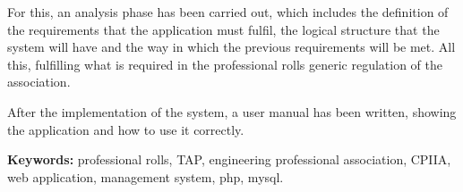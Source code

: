 For this, an analysis phase has been carried out, which includes the definition of the requirements that the application must fulfil, the logical structure that the system will have and the way in which the previous requirements will be met. All this, fulfilling what is required in the professional rolls generic regulation of the association. \par \vspace{\baselineskip}

After the implementation of the system, a user manual has been written, showing the application and how to use it correctly. \par \vspace{80pt}

\textbf{Keywords:} professional rolls, TAP, engineering professional association, CPIIA, web application, management system, php, mysql.

